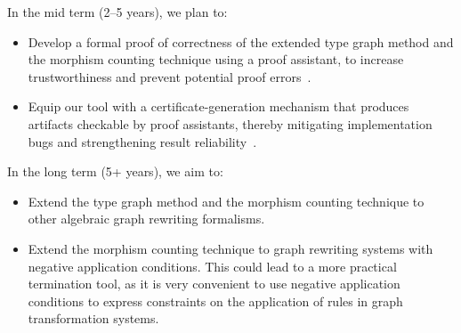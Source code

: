 In the mid term (2--5 years), we plan to:
    \begin{itemize}
      \item Develop a formal proof of correctness of the extended type graph method and the morphism counting technique using a proof assistant, to increase trustworthiness and prevent potential proof errors~\cite{contejean2004certified}.
      \item Equip our tool with a certificate-generation mechanism that produces artifacts checkable by proof assistants, thereby mitigating implementation bugs and strengthening result reliability~\cite{contejean2007certification,contejean2010a3pat}.
    \end{itemize}

In the long term (5+ years), we aim to:
    \begin{itemize}
      \item Extend the type graph method and the morphism counting technique to other algebraic graph rewriting formalisms.
      \item Extend the morphism counting technique to graph rewriting systems with negative application conditions. This could lead to a more practical termination tool, as it is very convenient to use negative application conditions to express constraints on the application of rules in graph transformation systems.
    \end{itemize}